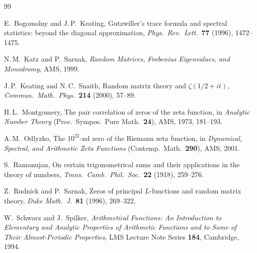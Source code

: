 \documentclass[11pt,a4paper]{article}
\begin{document}
\begin{thebibliography}{99}

E.~Bogomolny and J.\,P.~Keating,
Gutzwiller's trace formula and spectral statistics: beyond the diagonal approximation,
\emph{Phys.\ Rev.\ Lett.}\ \textbf{77} (1996), 1472--1475.

N.\,M.~Katz and P.~Sarnak,
\emph{Random Matrices, Frobenius Eigenvalues, and Monodromy},
AMS, 1999.

J.\,P.~Keating and N.\,C.~Snaith,
Random matrix theory and $\zeta(1/2+it)$,
\emph{Commun.\ Math.\ Phys.}\ \textbf{214} (2000), 57--89.

H.\,L.~Montgomery,
The pair correlation of zeros of the zeta function,
in \emph{Analytic Number Theory} (Proc.\ Sympos.\ Pure Math.\ \textbf{24}), AMS, 1973, 181--193.

A.\,M.~Odlyzko,
The $10^{22}$-nd zero of the Riemann zeta function,
in \emph{Dynamical, Spectral, and Arithmetic Zeta Functions} (Contemp.\ Math.\ \textbf{290}), AMS, 2001.

S.~Ramanujan,
On certain trigonometrical sums and their applications in the theory of numbers,
\emph{Trans.\ Camb.\ Phil.\ Soc.}\ \textbf{22} (1918), 259--276.

Z.~Rudnick and P.~Sarnak,
Zeros of principal $L$-functions and random matrix theory,
\emph{Duke Math.\ J.}\ \textbf{81} (1996), 269--322.

W.~Schwarz and J.~Spilker,
\emph{Arithmetical Functions: An Introduction to Elementary and Analytic Properties of Arithmetic Functions and to Some of Their Almost-Periodic Properties},
LMS Lecture Note Series \textbf{184}, Cambridge, 1994.

\end{thebibliography}
\end{document}
